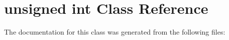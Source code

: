 \hypertarget{classunsigned_01int}{}\section{unsigned int Class Reference}
\label{classunsigned_01int}


The documentation for this class was generated from the following files\+: